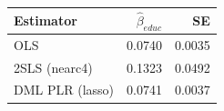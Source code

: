 \begin{tabular}{lrr}
    \toprule
    Estimator & $\hat\beta_{educ}$ & SE \\
    \midrule
        OLS & 0.0740 & 0.0035 \\
        2SLS (nearc4) & 0.1323 & 0.0492 \\
        DML PLR (lasso) & 0.0741 & 0.0037 \\
    \bottomrule
\end{tabular}
